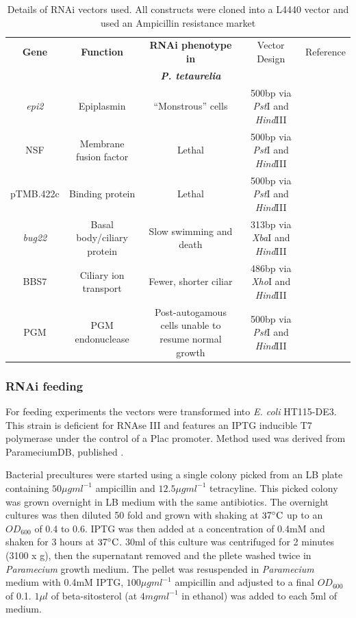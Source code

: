\begin{table}
    \begin{tabular}{|c|c|c|c|c|}
        \hline
    \textbf{Gene} & \textbf{Function} & \textbf{RNAi phenotype in}      & Vector Design & Reference \\
                  &                   & \textbf{\textit{P. tetaurelia}} &               &           \\
        \hline
        \textit{epi2} & Epiplasmin & ``Monstrous'' cells  & 500bp via \textit{Pst}I and \textit{Hind}III & \citep{Damaj2009} \\
        NSF & Membrane fusion factor & Lethal & 500bp via \textit{Pst}I and \textit{Hind}III & \citep{Galvani2002} \\
        pTMB.422c & Binding protein & Lethal & 500bp via \textit{Pst}I and \textit{Hind}III & \citep{Nowack2011} \\
        \textit{bug22} & Basal body/ciliary protein & Slow swimming and death & 313bp via \textit{Xba}I and \textit{Hind}III & \citep{Laligne2010} \\
        BBS7 & Ciliary ion transport & Fewer, shorter ciliar & 486bp via \textit{Xho}I and \textit{Hind}III & \citep{Valentine2012} \\
        PGM & PGM endonuclease & Post-autogamous cells unable to resume normal growth & 500bp via \textit{Pst}I and \textit{Hind}III & \citep{Baudry2009} \\
        \hline
    \end{tabular}
    \caption{Details of RNAi vectors used.  All constructs were cloned into a L4440 vector and used an Ampicillin resistance market}
    \label{tab:rnai_vecs}
\end{table}

\subsubsection{RNAi feeding}

For feeding experiments the vectors were transformed into \textit{E. coli} HT115-DE3.
This strain is deficient for RNAse III and features an IPTG inducible T7 polymerase
under the control of a Plac promoter. Method used was derived from ParameciumDB, 
published \citep{Beisson2010}.

Bacterial precultures were started using a single colony picked from an LB
plate containing \(50\mu gml^{-1}\) ampicillin and \(12.5\mu g ml^{-1}\) tetracyline.
This picked colony was grown overnight in LB medium with the same antibiotics.
The overnight cultures was then diluted 50 fold and grown with shaking
at \(37\celsius\) up to an \(OD_{600}\) of 0.4 to 0.6. IPTG
was then added at a concentration of 0.4mM and shaken for 3 hours
at \(37\celsius\).  30ml of this culture was centrifuged for 2 minutes (3100 x g),
then the supernatant removed and the pllete washed twice in \textit{Paramecium}
growth medium. The pellet was resuspended in \textit{Paramecium} medium with 0.4mM IPTG,
\(100\mu g ml^{-1}\) ampicillin and adjusted to a final \(OD_{600}\) of 0.1.
\(1 \mu l\) of beta-sitosterol (at \(4mg ml^{-1}\) in ethanol) was added
to each 5ml of medium.

